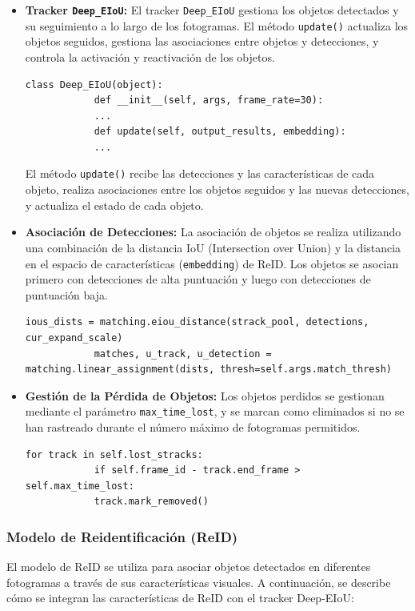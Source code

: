 \documentclass[12pt, a4paper, twoside]{article}
\begin{document}
\begin{itemize}
		\item \textbf{Tracker \texttt{Deep\_EIoU}:}  
		El tracker \texttt{Deep\_EIoU} gestiona los objetos detectados y su seguimiento a lo largo de los fotogramas. El método \texttt{update()} actualiza los objetos seguidos, gestiona las asociaciones entre objetos y detecciones, y controla la activación y reactivación de los objetos.
		\begin{lstlisting}[style=pythonstyle]
			class Deep_EIoU(object):
			def __init__(self, args, frame_rate=30):
			...
			def update(self, output_results, embedding):
			...
		\end{lstlisting}
		
		El método \texttt{update()} recibe las detecciones y las características de cada objeto, realiza asociaciones entre los objetos seguidos y las nuevas detecciones, y actualiza el estado de cada objeto.
		
		\item \textbf{Asociación de Detecciones:}  
		La asociación de objetos se realiza utilizando una combinación de la distancia IoU (Intersection over Union) y la distancia en el espacio de características (\texttt{embedding}) de ReID. Los objetos se asocian primero con detecciones de alta puntuación y luego con detecciones de puntuación baja.
		\begin{lstlisting}[style=pythonstyle]
			ious_dists = matching.eiou_distance(strack_pool, detections, cur_expand_scale)
			matches, u_track, u_detection = matching.linear_assignment(dists, thresh=self.args.match_thresh)
		\end{lstlisting}
		
		\item \textbf{Gestión de la Pérdida de Objetos:}  
		Los objetos perdidos se gestionan mediante el parámetro \texttt{max\_time\_lost}, y se marcan como eliminados si no se han rastreado durante el número máximo de fotogramas permitidos.
		\begin{lstlisting}[style=pythonstyle]
			for track in self.lost_stracks:
			if self.frame_id - track.end_frame > self.max_time_lost:
			track.mark_removed()
		\end{lstlisting}
	\end{itemize}
	
	\subsubsection{Modelo de Reidentificación (ReID)}
	
	El modelo de ReID se utiliza para asociar objetos detectados en diferentes fotogramas a través de sus características visuales. A continuación, se describe cómo se integran las características de ReID con el tracker Deep-EIoU:
	
\end{document}
